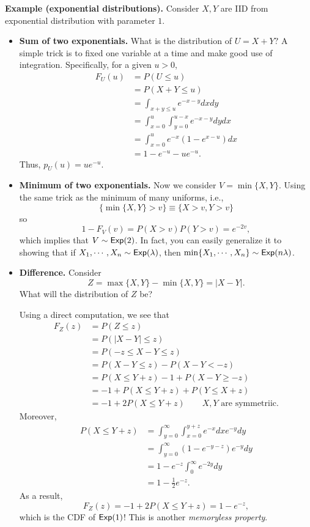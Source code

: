 \documentclass[twoside]{article}
\begin{document}
{\bf Example (exponential distributions).}
Consider $X,Y$ are IID from exponential distribution with parameter $1$. 
\begin{itemize}
\item {\bf Sum of two exponentials.} 
What is the distribution of $U = X+Y?$ 
A simple trick is to fixed one variable at a time and make good use of integration. 
Specifically, for a given $u>0$, 
\begin{align*}
F_U(u)&= P(U\leq u)\\
& = P(X+Y\leq u)\\
& = \int_{x+y\leq u} e^{-x-y}dxdy\\
& = \int_{x=0}^u \int_{y=0}^{u-x} e^{-x-y}dydx\\
& = \int_{x=0}^u e^{-x} (1-e^{x-u})dx\\
& = 1-e^{-u}-ue^{-u}.
\end{align*}
Thus, $p_U(u) = ue^{-u}$.


\item {\bf Minimum of two exponentials.} 
Now we consider $V = \min\{X,Y\}$. 
Using the same trick as the minimum of many uniforms, i.e.,
$$
\{\min\{X,Y\}>v\} \equiv \{X>v,Y>v\}
$$
so 
$$
1-F_V(v) = P(X>v)P(Y>v) = e^{-2v},
$$
which implies that $V\sim {\sf Exp}(2)$. 
In fact, you can easily generalize it to showing that if $X_1,\cdots, X_n\sim {\sf Exp}(\lambda)$,
then $\min\{X_1,\cdots, X_n\}\sim {\sf Exp}(n\lambda)$.


\item {\bf Difference.} 
Consider 
$$
Z = \max\{X,Y\} - \min\{X,Y\} = |X-Y|.
$$
What will the distribution of $Z$ be? 

Using a direct computation, we see that 
\begin{align*}
F_Z(z) & = P(Z\leq z)\\
& = P(|X-Y|\leq z)\\
& = P(-z\leq X-Y\leq z)\\
& = P(X- Y\leq z) - P(X-Y< -z)\\
& = P(X\leq Y+z) - 1+P(X-Y\geq -z)\\
& = -1 +P(X\leq Y+z) + P(Y\leq X+z)\\
&= -1 + 2P(X\leq Y+z) \qquad\mbox{$X,Y$ are symmetriic}.
\end{align*}
Moreover, 
\begin{align*}
P(X\leq Y+z) & = \int_{y=0}^\infty \int_{x=0}^{y+z} e^{-x}dx e^{-y}dy\\
& =  \int_{y=0}^\infty (1-e^{-y-z})e^{-y}dy\\
& = 1-e^{-z}\int_0^\infty e^{-2y}dy\\
& = 1-\frac{1}{2}e^{-z}.
\end{align*}
As a result,
$$
F_Z(z) = -1 + 2P(X\leq Y+z) = 1-e^{-z},
$$
which is the CDF of ${\sf Exp}(1)$!
This is another \emph{memoryless property}.



\end{itemize}
\end{document}
